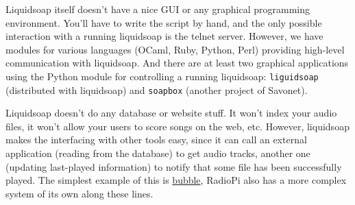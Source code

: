 Liquidsoap itself doesn't have a nice GUI or any graphical programming 
environment. You'll have to write the script by hand, and the only possible 
interaction with a running liquidsoap is the telnet server. However, we have 
modules for various languages (OCaml, Ruby, Python, Perl) providing high-level 
communication with liquidsoap. And there are at least two graphical 
applications using the Python module for controlling a running liquidsoap:
\verb+liguidsoap+ (distributed with liquidsoap) and \verb+soapbox+ (another project of 
Savonet).

Liquidsoap doesn't do any database or website stuff. It won't index your audio files, it won't allow your users to score songs on the web, etc. However, liquidsoap makes the interfacing with other tools easy, since it can call an external application (reading from the database) to get audio tracks, another one (updating last-played information) to notify that some file has been successfully played. The simplest example of this is \href{bubble.html}{bubble}, RadioPi also has a more complex system of its own along these lines.

